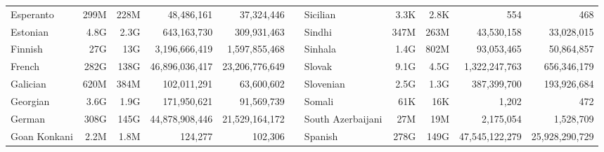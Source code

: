 \begin{table*}[t!]
{\begin{tabular}{@{}lrrrrclrrrr@{}}
            Esperanto                 & 299M                     & 228M                      & 48,486,161               & 37,324,446                &                          & Sicilian                  & 3.3K                     & 2.8K                      & 554                      & 468                       \\
            Estonian                  & 4.8G                     & 2.3G                      & 643,163,730              & 309,931,463               &                          & Sindhi                    & 347M                     & 263M                      & 43,530,158               & 33,028,015                \\
            Finnish                   & 27G                      & 13G                       & 3,196,666,419            & 1,597,855,468             &                          & Sinhala                   & 1.4G                     & 802M                      & 93,053,465               & 50,864,857                \\
            French                    & 282G                     & 138G                      & 46,896,036,417           & 23,206,776,649            &                          & Slovak                    & 9.1G                     & 4.5G                      & 1,322,247,763            & 656,346,179               \\
            Galician                  & 620M                     & 384M                      & 102,011,291              & 63,600,602                &                          & Slovenian                 & 2.5G                     & 1.3G                      & 387,399,700              & 193,926,684               \\
            Georgian                  & 3.6G                     & 1.9G                      & 171,950,621              & 91,569,739                &                          & Somali                    & 61K                      & 16K                       & 1,202                    & 472                       \\
            German                    & 308G                     & 145G                      & 44,878,908,446           & 21,529,164,172            &                          & South Azerbaijani         & 27M                      & 19M                       & 2,175,054                & 1,528,709                 \\
            Goan Konkani              & 2.2M                     & 1.8M                      & 124,277                  & 102,306                   &                          & Spanish                   & 278G                     & 149G                      & 47,545,122,279           & 25,928,290,729            \\

\end{tabular}}
\end{table*}
